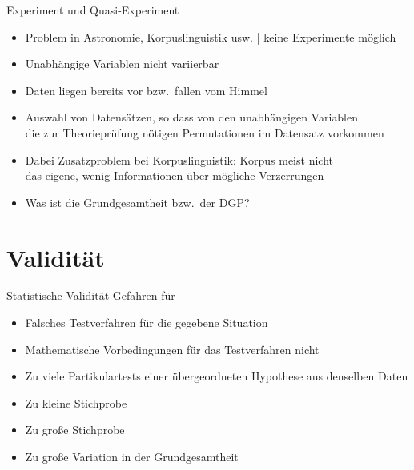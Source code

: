 \begin{frame}
  {Experiment und Quasi-Experiment}
  \begin{itemize}[<+->]
    \item Problem in Astronomie, Korpuslinguistik usw. | keine Experimente möglich
    \item \alert{Unabhängige Variablen nicht variierbar}
    \item Daten liegen bereits vor bzw.\ fallen vom Himmel
    \item Auswahl von Datensätzen, so dass von den unabhängigen Variablen\\
      die zur Theorieprüfung nötigen Permutationen im Datensatz vorkommen
    \item Dabei Zusatzproblem bei Korpuslinguistik: Korpus meist nicht\\
      das eigene, wenig Informationen über mögliche Verzerrungen
      \Zeile
    \item \alert{Was ist die Grundgesamtheit bzw.\ der DGP?}
  \end{itemize}
\end{frame}


\section{Validität}

\begin{frame}
  {Statistische Validität}
  Gefahren für \\
  \Zeile
  \begin{itemize}[<+->]
    \item \alert{Falsches Testverfahren} für die gegebene Situation
    \item \alert{Mathematische Vorbedingungen} für das Testverfahren nicht
    \item \alert{Zu viele Partikulartests} einer übergeordneten Hypothese aus denselben Daten
    \item Zu \alert{kleine Stichprobe}
    \item Zu \alert{große Stichprobe}
    \item Zu große Variation in der Grundgesamtheit
  \end{itemize}
\end{frame}

